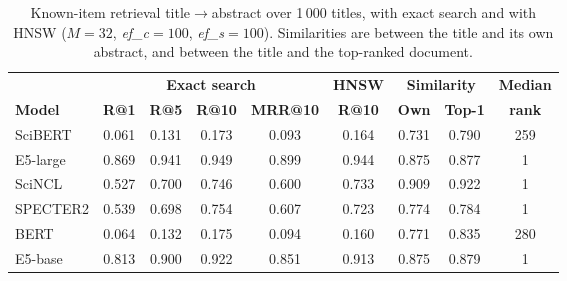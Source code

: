 \begin{table}[tbp]
\caption{Known-item retrieval title$\rightarrow$abstract over 1\,000 titles, with exact search and with HNSW ($M=32$, \textit{ef\_c}$=100$, \textit{ef\_s}$=100$). Similarities are between the title and its own abstract, and between the title and the top-ranked document.}\label{tab:naturales}
\centering
\small
\begin{tabular}{|l|c|c|c|c|c|c|c|c|}
\hline
 & \multicolumn{4}{c|}{\textbf{Exact search}} & \textbf{HNSW} & \multicolumn{2}{c|}{\textbf{Similarity}} & \textbf{Median} \\ \cline{2-8}
\textbf{Model} & \textbf{R@1} & \textbf{R@5} & \textbf{R@10} & \textbf{MRR@10} & \textbf{R@10} & \textbf{Own} & \textbf{Top-1} & \textbf{rank} \\
\hline
SciBERT & 0.061 & 0.131 & 0.173 & 0.093 & 0.164 & 0.731 & 0.790 & 259 \\
E5-large & 0.869 & 0.941 & 0.949 & 0.899 & 0.944 & 0.875 & 0.877 & 1 \\
SciNCL & 0.527 & 0.700 & 0.746 & 0.600 & 0.733 & 0.909 & 0.922 & 1 \\
SPECTER2 & 0.539 & 0.698 & 0.754 & 0.607 & 0.723 & 0.774 & 0.784 & 1 \\
BERT & 0.064 & 0.132 & 0.175 & 0.094 & 0.160 & 0.771 & 0.835 & 280 \\
E5-base & 0.813 & 0.900 & 0.922 & 0.851 & 0.913 & 0.875 & 0.879 & 1 \\
\hline
\end{tabular}
\end{table}